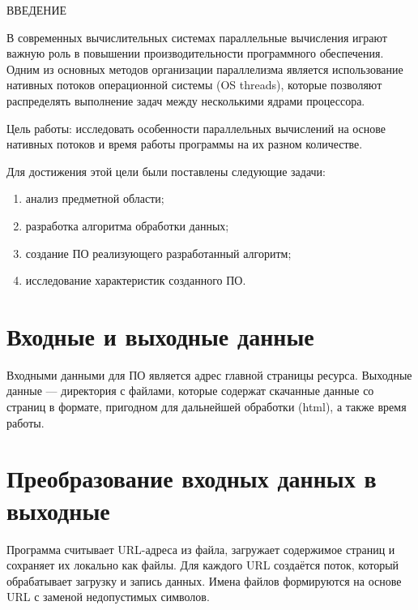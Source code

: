\begin{center}
    \MakeUppercase{Введение}
\end{center}

В современных вычислительных системах параллельные вычисления играют важную роль в повышении производительности программного обеспечения. Одним из основных методов организации параллелизма является использование нативных потоков операционной системы (OS threads), которые позволяют распределять выполнение задач между несколькими ядрами процессора.
\vspace{0.25cm}

Цель работы: исследовать особенности параллельных вычислений на основе нативных потоков и время работы программы на их разном количестве.

\vspace{0.25cm}
Для достижения этой цели были поставлены следующие задачи:

\begin{enumerate}

\item анализ предметной области;
\item разработка алгоритма обработки данных;
\item создание ПО реализующего разработанный алгоритм;
\item исследование характеристик созданного ПО.

\end{enumerate}

\section{Входные и выходные данные}

\hspace{1.25cm}
Входными данными для ПО является адрес главной страницы ресурса. Выходные данные --- директория с файлами, которые содержат скачанные данные со страниц в формате, пригодном для дальнейшей обработки (html), а также время работы.

\section{Преобразование входных данных в выходные}

\hspace{1.25cm}
Программа считывает URL-адреса из файла, загружает содержимое страниц и сохраняет их локально как файлы. Для каждого URL создаётся поток, который обрабатывает загрузку и запись данных. Имена файлов формируются на основе URL с заменой недопустимых символов.